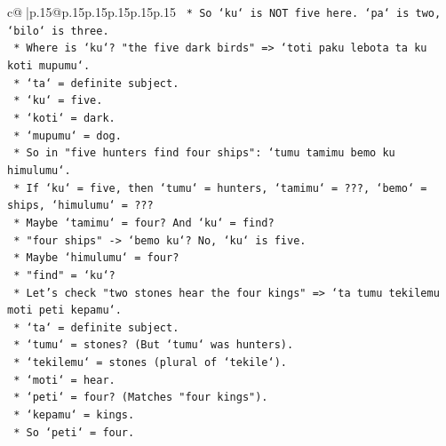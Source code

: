 \documentclass{article}
\begin{document}
{\begin{supertabular}{c@{$\;$}|p{.15\linewidth}@{}p{.15\linewidth}p{.15\linewidth}p{.15\linewidth}p{.15\linewidth}p{.15\linewidth}}
{{{\texttt{                                    *   So `ku` is NOT five here. `pa` is two, `bilo` is three.} \\
\texttt{                                    *   Where is `ku`? "the five dark birds" => `toti paku lebota ta ku koti mupumu`.} \\
\texttt{                                        *   `ta` = definite subject.} \\
\texttt{                                        *   `ku` = five.} \\
\texttt{                                        *   `koti` = dark.} \\
\texttt{                                        *   `mupumu` = dog.} \\
\texttt{                                    *   So in "five hunters find four ships": `tumu tamimu bemo ku himulumu`.} \\
\texttt{                                        *   If `ku` = five, then `tumu` = hunters, `tamimu` = ???, `bemo` = ships, `himulumu` = ???} \\
\texttt{                                        *   Maybe `tamimu` = four? And `ku` = find?} \\
\texttt{                                        *   "four ships" {-}> `bemo ku`? No, `ku` is five.} \\
\texttt{                                        *   Maybe `himulumu` = four?} \\
\texttt{                                        *   "find" = `ku`?} \\
\texttt{                                        *   Let's check "two stones hear the four kings" => `ta tumu tekilemu moti peti kepamu`.} \\
\texttt{                                            *   `ta` = definite subject.} \\
\texttt{                                            *   `tumu` = stones? (But `tumu` was hunters).} \\
\texttt{                                            *   `tekilemu` = stones (plural of `tekile`).} \\
\texttt{                                            *   `moti` = hear.} \\
\texttt{                                            *   `peti` = four? (Matches "four kings").} \\
\texttt{                                            *   `kepamu` = kings.} \\
\texttt{                                        *   So `peti` = four.} \\
}}}
\end{supertabular}}
\end{document}
